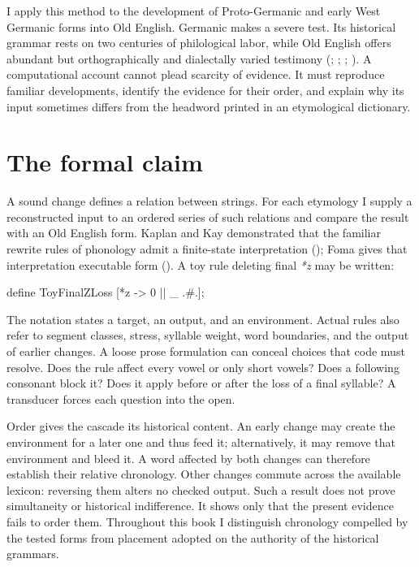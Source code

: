 \documentclass[
  british,
  a4paper,
  openany]{book}
\begin{document}
I apply this method to the development of Proto-Germanic and early West
Germanic forms into Old English. Germanic makes a severe test. Its
historical grammar rests on two centuries of philological labor, while
Old English offers abundant but orthographically and dialectally varied
testimony (;
; ; ). A computational
account cannot plead scarcity of evidence. It must reproduce familiar
developments, identify the evidence for their order, and explain why its
input sometimes differs from the headword printed in an etymological
dictionary.

\section{The formal claim}\label{the-formal-claim}

A sound change defines a relation between strings. For each etymology I
supply a reconstructed input to an ordered series of such relations and
compare the result with an Old English form. Kaplan and Kay demonstrated
that the familiar rewrite rules of phonology admit a finite-state
interpretation (); Foma
gives that interpretation executable form
(). A toy rule deleting final
\emph{*z} may be written:

\begin{ReaderFacingFoma}
define ToyFinalZLoss [{*z} -> 0 || _ .#.];
\end{ReaderFacingFoma}

The notation states a target, an output, and an environment. Actual
rules also refer to segment classes, stress, syllable weight, word
boundaries, and the output of earlier changes. A loose prose formulation
can conceal choices that code must resolve. Does the rule affect every
vowel or only short vowels? Does a following consonant block it? Does it
apply before or after the loss of a final syllable? A transducer forces
each question into the open.

Order gives the cascade its historical content. An early change may
create the environment for a later one and thus feed it; alternatively,
it may remove that environment and bleed it. A word affected by both
changes can therefore establish their relative chronology. Other changes
commute across the available lexicon: reversing them alters no checked
output. Such a result does not prove simultaneity or historical
indifference. It shows only that the present evidence fails to order
them. Throughout this book I distinguish chronology compelled by the
tested forms from placement adopted on the authority of the historical
grammars.
\end{document}
